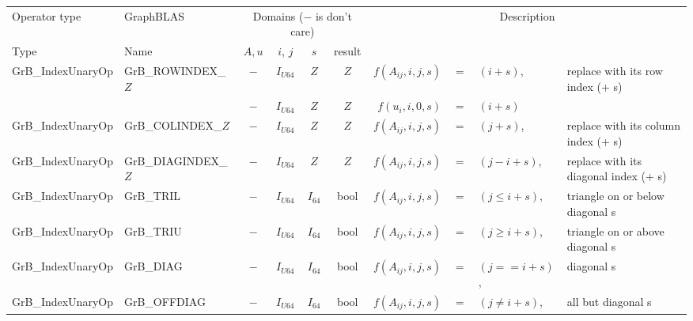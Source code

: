 \begin{landscape}
\begin{table}
\begin{threeparttable}
\begin{tabular}{l|l|cccc|rcll}
Operator type             & GraphBLAS                & \multicolumn{4}{c|}{Domains ($-$ is don't care)}& \multicolumn{4}{c}{Description} \\ 
Type                      & Name                     & $A,u$ & $i$, $j$  & $s$ & result                & &&& \\ \hline
{\sf GrB\_IndexUnaryOp}   & {\sf GrB\_ROWINDEX\_$Z$} & $-$   & $I_{U64}$ & $Z$ & $Z$ & $f(A_{ij},i,j,s)$ & $=$ & $(i + s)$, & replace with its row index (+ s) \\
                          &                          & $-$   & $I_{U64}$ & $Z$ & $Z$ & $f(u_{i}, i,0,s)$ & $=$ & $(i + s)$  & \\
{\sf GrB\_IndexUnaryOp}   & {\sf GrB\_COLINDEX\_$Z$} & $-$   & $I_{U64}$ & $Z$ & $Z$ & $f(A_{ij},i,j,s)$ & $=$ & $(j + s)$, & replace with its column index (+ s) \\
{\sf GrB\_IndexUnaryOp}   & {\sf GrB\_DIAGINDEX\_$Z$}& $-$   & $I_{U64}$ & $Z$ & $Z$ & $f(A_{ij},i,j,s)$ & $=$ & $(j - i + s)$, & replace with its diagonal index (+ s) \\
\hline

{\sf GrB\_IndexUnaryOp}   & {\sf GrB\_TRIL}    & $-$ & $I_{U64}$ & $I_{64}$ & {\sf bool} & $f(A_{ij},i,j,s)$ & $=$ & $(j \leq i + s)$, & triangle on or below diagonal s \\
{\sf GrB\_IndexUnaryOp}   & {\sf GrB\_TRIU}    & $-$ & $I_{U64}$ & $I_{64}$ & {\sf bool} & $f(A_{ij},i,j,s)$ & $=$ & $(j \geq i + s)$, & triangle on or above diagonal s \\
{\sf GrB\_IndexUnaryOp}   & {\sf GrB\_DIAG}    & $-$ & $I_{U64}$ & $I_{64}$ & {\sf bool} & $f(A_{ij},i,j,s)$ & $=$ & $(j  ==  i + s)$, & diagonal s \\
{\sf GrB\_IndexUnaryOp}   & {\sf GrB\_OFFDIAG} & $-$ & $I_{U64}$ & $I_{64}$ & {\sf bool} & $f(A_{ij},i,j,s)$ & $=$ & $(j \neq i + s)$, & all but diagonal s \\


\end{tabular}
\end{threeparttable}
\end{table}
\end{landscape}
